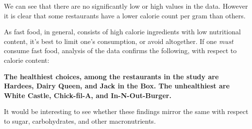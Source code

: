 \documentclass[12pt,fleqn]{article}
\begin{document}
\pagebreak
We can see that there are no significantly low or high values in the data. However it is clear that some restaurants have a lower calorie count per gram than others.

As fast food, in general, consists of high calorie ingredients with low nutritional content, it's best to limit one's consumption, or avoid altogether. If one \textit{must} consume fast food, analysis of the data confirms the following, with respect to calorie content:

\textbf{The healthiest choices, among the restaurants in the study are Hardees, Dairy Queen, and Jack in the Box. The unhealthiest are White Castle, Chick-fil-A, and In-N-Out-Burger.}

It would be interesting to see whether these findings mirror the same with respect to sugar, carbohydrates, and other macronutrients.
\end{document}
